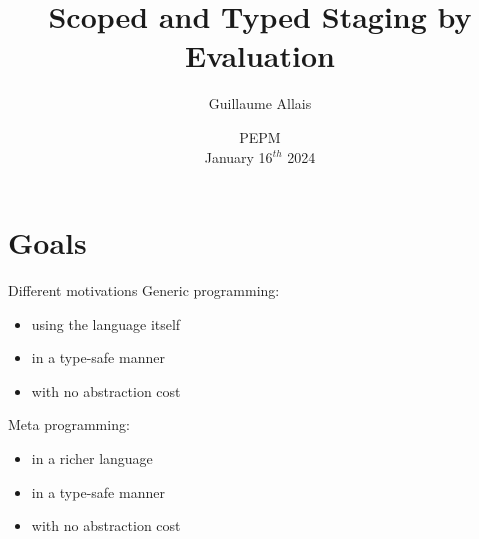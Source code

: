 \documentclass[aspectratio=169]{beamer}
\title{Scoped and Typed Staging by Evaluation}
\author{Guillaume Allais}
\institute{University of Strathclyde}
\date{PEPM \\ January 16$^{th}$ 2024}
\begin{document}
\begin{frame}
  \maketitle
\end{frame}

\section{Goals}

\begin{frame}{Different motivations}
Generic programming:

\begin{itemize}
  \item using the language itself
  \item in a type-safe manner
  \item with no abstraction cost
\end{itemize}

\bigskip

Meta programming:

\begin{itemize}
  \item in a richer language
  \item in a type-safe manner
  \item with no abstraction cost
\end{itemize}
\end{frame}
\end{document}
